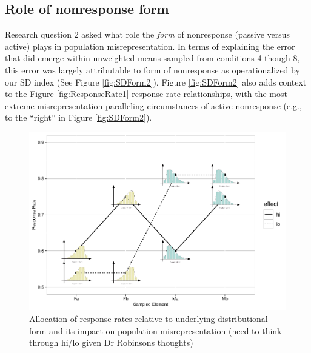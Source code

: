 \documentclass[
  man,mask]{apa7}
\begin{document}
\subsection{Role of nonresponse form}\label{role-of-nonresponse-form}

Research question 2 asked what role the \emph{form} of nonresponse (passive versus active) plays in population misrepresentation. In terms of explaining the error that did emerge within unweighted means sampled from conditions 4 though 8, this error was largely attributable to form of nonresponse as operationalized by our SD index (See Figure \ref{fig:SDForm2}). Figure \ref{fig:SDForm2} also adds context to the Figure \ref{fig:ResponseRate1} response rate relationships, with the most extreme misrepresentation paralleling circumstances of active nonresponse (e.g., to the ``right'' in Figure \ref{fig:SDForm2}).

\begin{figure}
\centering
\includegraphics{Simulation-paper2-20200207_files/figure-latex/CattelExplain-1.pdf}
\caption{\label{fig:CattelExplain}Allocation of response rates relative to underlying distributional form and its impact on population misrepresentation (need to think through hi/lo given Dr Robinsons thoughts)}
\end{figure}
\end{document}

